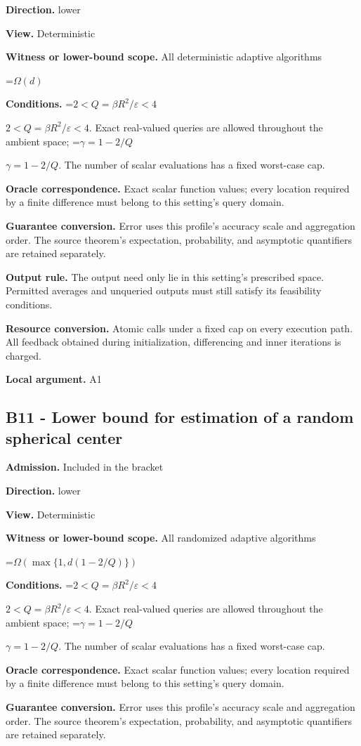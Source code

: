 \documentclass[10pt,a4paper]{article}
\newcommand{\AtlasMath}[1]{\par\begingroup\centering\setbox0=\hbox{$\displaystyle #1$}\ifdim\wd0>1.4\linewidth\typeout{ATLAS WIDE FORMULA: \the\wd0}\fi\ifdim\wd0>\linewidth\resizebox{\linewidth}{!}{\box0}\else\box0\fi\par\endgroup}
\newcommand{\AtlasInlineMath}[1]{\begingroup\setbox0=\hbox{$#1$}\ifdim\wd0>.4\linewidth\endgroup\AtlasMath{#1}\else\endgroup$#1$\fi}
\begin{document}
\textbf{Direction.} lower

\textbf{View.} Deterministic

\textbf{Witness or lower-bound scope.} All deterministic adaptive algorithms

\AtlasMath{\Omega(d)}
\textbf{Conditions.} \AtlasInlineMath{2<Q=\beta R^2/\varepsilon<4}. Exact real-valued queries are allowed throughout the ambient space; \AtlasInlineMath{\gamma=1-2/Q}. The number of scalar evaluations has a fixed worst-case cap.

\textbf{Oracle correspondence.} Exact scalar function values; every location required by a finite difference must belong to this setting's query domain.

\textbf{Guarantee conversion.} Error uses this profile's accuracy scale and aggregation order. The source theorem's expectation, probability, and asymptotic quantifiers are retained separately.

\textbf{Output rule.} The output need only lie in this setting's prescribed space. Permitted averages and unqueried outputs must still satisfy its feasibility conditions.

\textbf{Resource conversion.} Atomic calls under a fixed cap on every execution path. All feedback obtained during initialization, differencing and inner iterations is charged.

\textbf{Local argument.} A1

\subsection{B11 - Lower bound for estimation of a random spherical center}
\textbf{Admission.} Included in the bracket

\textbf{Direction.} lower

\textbf{View.} Deterministic

\textbf{Witness or lower-bound scope.} All randomized adaptive algorithms

\AtlasMath{\Omega(\max\{1,d(1-2/Q)\})}
\textbf{Conditions.} \AtlasInlineMath{2<Q=\beta R^2/\varepsilon<4}. Exact real-valued queries are allowed throughout the ambient space; \AtlasInlineMath{\gamma=1-2/Q}. The number of scalar evaluations has a fixed worst-case cap.

\textbf{Oracle correspondence.} Exact scalar function values; every location required by a finite difference must belong to this setting's query domain.

\textbf{Guarantee conversion.} Error uses this profile's accuracy scale and aggregation order. The source theorem's expectation, probability, and asymptotic quantifiers are retained separately.
\end{document}
